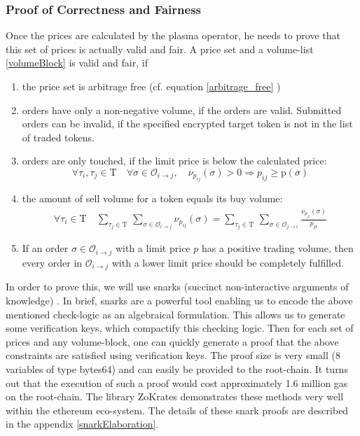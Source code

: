 \documentclass[11pt,parskip=full]{scrartcl}%
\newcommand{\Tau}{\mathrm{T}}
\def\pO{\mathcal{O}}
\def\ra{\rightarrow}
\begin{document}
\subsubsection*{Proof of Correctness and Fairness}
\label{proofprices}
Once the prices are calculated by the plasma operator, he needs to prove that this set of prices is actually valid and fair. A price set and a volume-list \ref{volumeBlock} is valid and fair, if

\begin{enumerate}

\item the price set is arbitrage free (cf. equation \ref{arbitrage_free} )
\item orders have only a non-negative volume, if the orders are valid. Submitted orders can be invalid, if the specified encrypted target token is not in the list of traded tokens.
\item orders are only touched, if the limit price is below the calculated price:\newline
\begin{equation} \forall \tau_i ,\tau_j \in \Tau \quad \forall \sigma \in \pO_{i\ra j}, \quad \nu_{p_{ij}}(\sigma)>0 \Rightarrow p_{ij}\geq \text{p}(\sigma)
\label{limitprice_sat}
\end{equation}
\item the amount of sell volume for a token equals its buy volume: 
\begin{equation}
\begin{split}
\forall \tau_i \in \Tau \quad \sum_{\tau_j\in \Tau} \,
\sum_{ \sigma\in \pO_{i \rightarrow j}} \nu_{p_{ij}}(\sigma) = \sum_{\tau_j\in \Tau} \, \sum_{\sigma\in \pO_{j\rightarrow i}} \frac{\nu_{p_{ji}}(\sigma)}{p_{ji}}
\label{volume_balance}
\end{split}
\end{equation}
\item If an order $\sigma \in \pO_{i\rightarrow j}$ with a limit price $p$ has a positive trading volume, then every order in $\pO_{i\rightarrow j}$ with a lower limit price should be completely fulfilled. 
\end{enumerate}


In order to prove this, we will use snarks (succinct non-interactive arguments of knowledge) \cite{snarks}. 
In brief, snarks are a powerful tool enabling us to encode the above mentioned check-logic as an algebraical formulation. 
This allows us to generate some verification keys, which compactify this checking logic. 
Then for each set of prices and any volume-block, one can quickly generate a proof that the above constraints are satisfied using verification keys. 
The proof size is very small (8 variables of type bytes64) and can easily be provided to the root-chain. 
It turns out that the execution of such a proof would cost approximately 1.6 million gas on the root-chain. 
The library ZoKrates \cite{zokrates} demonstrates these methods very well within the ethereum eco-system. 
The details of these snark proofs are described in the appendix \ref{snarkElaboration}.
\end{document}
